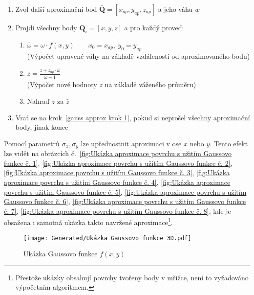 \begin{enumerate}
    \item \label{gauss approx krok 1} Zvol další aproximační bod $\bar{\bm{Q}} = [x_{ap}, y_{ap}, z_{ap}]$ a jeho váhu $w$
    \item Projdi všechny body $\bm{Q}_i = [x,y,z]$ a pro každý proveď:
          \begin{enumerate}
              \item $\bar{\omega} = \omega \cdot f(x, y) \quad \quad x_0 = x_{ap},~y_0 = y_{ap}$\\
                    {\tiny{(Výpočet upravené váhy na základě vzdálenosti od aproximovaného bodu)}}
              \item $\bar{z} = \frac{z + z_{ap} \cdot \bar{\omega} }{\bar{\omega} + 1}$\\
                    {\tiny{(Výpočet nové hodnoty $z$ na základě váženého průměru)}}
              \item Nahraď $z$ za $\bar{z}$
          \end{enumerate}
    \item Vrať se na krok~\ref{gauss approx krok 1}, pokud si neprošel všechny
          aproximační body, jinak konec
\end{enumerate}
Pomocí parametrů $\sigma_x, \sigma_y$ lze upřednostnit aproximaci v ose $x$ nebo $y$. Tento efekt lze vidět na obrázcích
č.~\ref{fig:Ukázka aproximace povrchu s užitím Gaussovo funkce č. 1},
\ref{fig:Ukázka aproximace povrchu s užitím Gaussovo funkce č. 2},
\ref{fig:Ukázka aproximace povrchu s užitím Gaussovo funkce č. 3},
\ref{fig:Ukázka aproximace povrchu s užitím Gaussovo funkce č. 4},
\ref{fig:Ukázka aproximace povrchu s užitím Gaussovo funkce č. 5},
\ref{fig:Ukázka aproximace povrchu s užitím Gaussovo funkce č. 6},
\ref{fig:Ukázka aproximace povrchu s užitím Gaussovo funkce č. 7},
\ref{fig:Ukázka aproximace povrchu s užitím Gaussovo funkce č. 8},
kde je obsažena i samotná ukázka takto navržené aproximace\footnote{Přestože
    ukázky obsahují povrchy tvořeny body v mřížce, není to vyžadováno výpočetním algoritmem.
}.
\begin{figure}[H]
    \centering
    \texttt{[image: Generated/Ukázka Gaussovo funkce 3D.pdf]}
    \caption{Ukázka Gaussovo funkce $f(x,y)$}
    \label{fig:Ukázka Gaussovo funkce 3D}
\end{figure}
